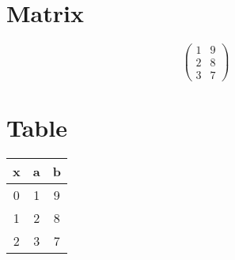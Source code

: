 \documentclass{article}%
\begin{document}
%
\normalsize%
\section{Matrix}%
\label{sec:Matrix}%
\[%
\begin{pmatrix}%
1&9\\%
2&8\\%
3&7%
\end{pmatrix}%
\]

%
\section{Table}%
\label{sec:Table}%
\begin{tabular}{ccc}%
\hline%
x&a&b\\%
\hline%
0&1&9\\%
1&2&8\\%
2&3&7\\%
\hline%
\end{tabular}

%
\end{document}
